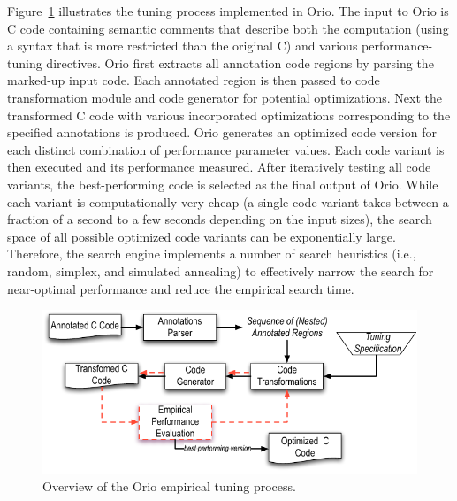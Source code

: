 \documentclass[runningheads]{llncs}
\begin{document}
Figure~\ref{fig:orio} illustrates the tuning process implemented in
Orio. The input to Orio is C code containing semantic comments that
describe both the computation (using a syntax that is more restricted
than the original C) and various performance-tuning directives. Orio
first extracts all annotation code regions by parsing the marked-up
input code. Each annotated region is then passed to code
transformation module and code generator for potential
optimizations. Next the transformed C code with various incorporated
optimizations corresponding to the specified annotations is
produced. Orio generates an optimized code version for each distinct
combination of performance parameter values. Each code
variant is then executed and its performance measured. After
iteratively testing all code variants, the best-performing code is
selected as the final output of Orio. While each variant is
computationally very cheap (a single code variant takes between a
fraction of a second to a few seconds depending on the input sizes),
the search space of all possible optimized code variants can be
exponentially large. Therefore, the search engine implements a number
of search heuristics (i.e., random, simplex, and simulated annealing)
to effectively narrow the search for near-optimal performance and
reduce the empirical search time. 

\begin{figure}[tb]
\begin{center}
\includegraphics[width=.65\textwidth]{figures/orio.pdf}
\end{center}
\vspace{-.2in}
\caption{Overview of the Orio empirical tuning process.}
\label{fig:orio}
\vspace{-.15in}
\end{figure}

\end{document}
